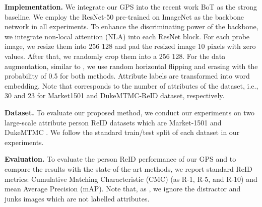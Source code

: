 \documentclass[final]{cvpr}
\begin{document}
\textbf{Implementation.} We integrate our GPS into the recent work BoT \cite{BoT} as the strong baseline. We employ the ResNet-50 \cite{resnet} pre-trained on ImageNet as the backbone network in all experiments. To enhance the discriminating power of the backbone, we integrate non-local attention (NLA) \cite{wang2018non} into each ResNet block. For each probe image, we resize them into 256  128 and pad the resized image 10 pixels with zero values. After that, we randomly crop them into a 256  128. For the data augmentation, similar to \cite{BoT,mancs,scal}, we use random horizontal flipping and erasing with the probability of 0.5 for both methods. Attribute labels are transformed into  word embedding. Note that  corresponds to the number of attributes of the dataset, i.e., 30 and 23 for Market1501 \cite{market1501} and DukeMTMC-ReID \cite{dukemtmc} dataset, respectively.



\textbf{Dataset.} To evaluate our proposed method, we conduct our experiments on two large-scale attribute person ReID datasets which are Market-1501 \cite{market1501} and DukeMTMC \cite{dukemtmc}. We follow the standard train/test split of each dataset in our experiments. 





\textbf{Evaluation.} To evaluate the person ReID performance of our GPS and to compare the results with the state-of-the-art methods, we report standard ReID metrics: Cumulative Matching Characteristic (CMC) (as R-1, R-5, and R-10) and mean Average Precision (mAP). Note that, as \cite{attreid}, we ignore the distractor and junks images which are not labelled attributes.
\end{document}
